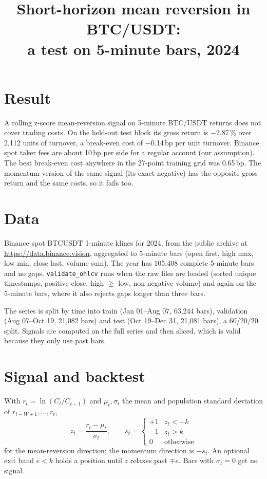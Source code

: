 \documentclass[11pt,a4paper]{article}
\title{Short-horizon mean reversion in BTC/USDT:\\ a test on 5-minute bars, 2024}
\date{}
\begin{document}
\maketitle

\section*{Result}

A rolling z-score mean-reversion signal on 5-minute BTC/USDT returns does not
cover trading costs. On the held-out test block its gross return is
$-$2.87\,\% over 2,112 units of turnover,
a break-even cost of $-$0.14\,bp per unit turnover. Binance spot
taker fees are about 10\,bp per side for a regular account (our assumption).
The best break-even cost anywhere in the 27-point training grid was
0.65\,bp. The momentum version of the same signal (its exact
negative) has the opposite gross return and the same costs, so it fails too.

\section{Data}

Binance spot BTCUSDT 1-minute klines for 2024, from the public archive at
\url{https://data.binance.vision}, aggregated to 5-minute bars
(open first, high max, low min, close last, volume sum). The year has
105,408 complete 5-minute bars and no gaps.
\texttt{validate\_ohlcv} runs when the raw files are loaded (sorted unique
timestamps, positive close, high $\geq$ low, non-negative volume) and again
on the 5-minute bars, where it also rejects gaps longer than three bars.

The series is split by time into train (Jan 01--Aug 07,
63,244 bars), validation (Aug 07--Oct 19,
21,082 bars) and test (Oct 19--Dec 31,
21,081 bars), a 60/20/20 split. Signals are computed on the full
series and then sliced, which is valid because they only use past bars.

\section{Signal and backtest}

With $r_t = \ln(C_t/C_{t-1})$ and $\mu_t,\sigma_t$ the mean and population
standard deviation of $r_{t-W+1},\dots,r_t$,
\begin{equation}
  z_t = \frac{r_t-\mu_t}{\sigma_t}, \qquad
  s_t = \begin{cases} +1 & z_t < -k\\ -1 & z_t > k\\ 0 & \text{otherwise} \end{cases}
\end{equation}
for the mean-reversion direction; the momentum direction is $-s_t$. An optional
exit band $e<k$ holds a position until $z$ relaxes past $\mp e$. Bars with
$\sigma_t=0$ get no signal.
\end{document}
